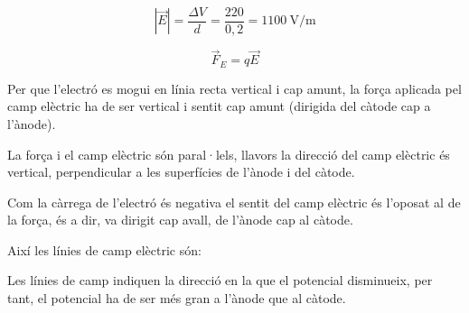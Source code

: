 \begin{solapartat}
 \[ \left|\vec{E}\right| = \frac{\Delta V}{d} = \frac{220}{0,2} = 1100\ \mathrm{V/m} \]

 \[ \vec{F}_E = q\vec{E} \]


 Per que l'electró es mogui en línia recta vertical i cap amunt, la força aplicada pel camp elèctric ha de ser vertical i sentit cap amunt (dirigida del càtode cap a l'ànode).

La força i el camp elèctric són paral·lels, llavors la direcció del camp elèctric és vertical, perpendicular a les superfícies de l'ànode i del càtode.

 Com la càrrega de l'electró és negativa el sentit del camp elèctric és l'oposat al de la força, és a dir, va dirigit cap avall, de l'ànode cap al càtode.

Així les línies de camp elèctric són:


 Les línies de camp indiquen la direcció en la que el potencial disminueix, per tant, el potencial ha de ser més gran a l'ànode que al càtode.
\end{solapartat}

